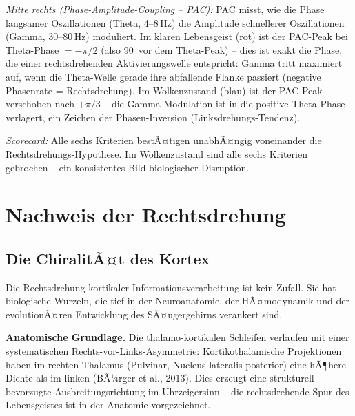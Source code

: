 ﻿\documentclass[12pt,a4paper]{report}
\theoremstyle{plain}
\theoremstyle{definition}
\theoremstyle{remark}
\begin{document}
	\textit{Mitte rechts (Phase-Amplitude-Coupling -- PAC):}
	PAC misst, wie die Phase langsamer Oszillationen (Theta, 4--8\,Hz)
	die Amplitude schnellerer Oszillationen (Gamma, 30--80\,Hz) moduliert.
	Im klaren Lebensgeist (rot) ist der PAC-Peak bei Theta-Phase $= -\pi/2$
	(also 90\textdegree\ vor dem Theta-Peak) -- dies ist exakt die
	Phase, die einer rechtsdrehenden Aktivierungswelle entspricht:
	Gamma tritt maximiert auf, wenn die Theta-Welle gerade ihre abfallende
	Flanke passiert (negative Phasenrate = Rechtsdrehung).
	Im Wolkenzustand (blau) ist der PAC-Peak verschoben nach $+\pi/3$ --
	die Gamma-Modulation ist in die positive Theta-Phase verlagert,
	ein Zeichen der Phasen-Inversion (Linksdrehungs-Tendenz).

	\textit{Scorecard:}
	Alle sechs Kriterien bestÃ¤tigen unabhÃ¤ngig voneinander die
	Rechtsdrehungs-Hypothese. Im Wolkenzustand sind alle sechs Kriterien
	gebrochen -- ein konsistentes Bild biologischer Disruption.
	
	\chapter{Nachweis der Rechtsdrehung}
	
	\section{Die ChiralitÃ¤t des Kortex}
	
	Die Rechtsdrehung kortikaler Informationsverarbeitung ist kein Zufall.
	Sie hat biologische Wurzeln, die tief in der Neuroanatomie, der
	HÃ¤modynamik und der evolutionÃ¤ren Entwicklung des SÃ¤ugergehirns
	verankert sind.
	
	\textbf{Anatomische Grundlage.}
	Die thalamo-kortikalen Schleifen verlaufen mit einer systematischen
	Rechts-vor-Links-Asymmetrie: Kortikothalamische Projektionen haben
	im rechten Thalamus (Pulvinar, Nucleus lateralis posterior) eine
	hÃ¶here Dichte als im linken (BÃ¼rger et al., 2013).
	Dies erzeugt eine strukturell bevorzugte Ausbreitungsrichtung im
	Uhrzeigersinn -- die rechtsdrehende Spur des Lebensgeistes ist in
	der Anatomie vorgezeichnet.
	
\end{document}
